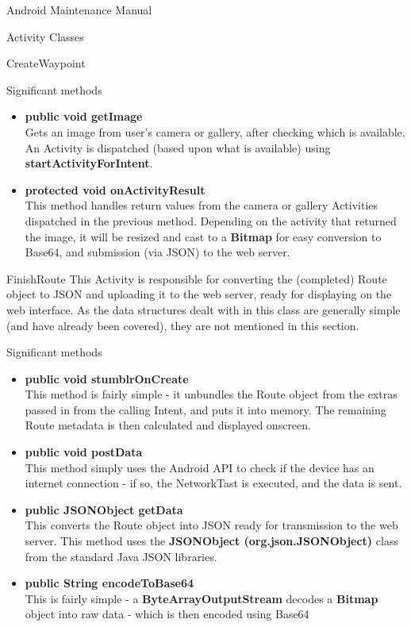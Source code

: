 \documentclass{article}
\begin{document}
\begin{section}{Android Maintenance Manual}
\begin{subsection}{Activity Classes}
\begin{subsubsection}{CreateWaypoint}
\begin{paragraph}{Significant methods}
\begin{itemize}
					\item{{\bf public void getImage} \\
					Gets an image from user's camera or gallery, after checking which is available. An Activity is dispatched (based upon what is available) using {\bf startActivityForIntent}.}
					
					\item{{\bf protected void onActivityResult} \\
					This method handles return values from the camera or gallery Activities dispatched in the previous method. Depending on the activity that returned the image, it will be resized and cast to a {\bf Bitmap} for easy conversion to Base64, and submission (via JSON) to the web server.}
				\end{itemize}
			\end{paragraph}
		\end{subsubsection}
		
		\newpage
		\begin{subsubsection}{FinishRoute}
		This Activity is responsible for converting the (completed) Route object to JSON and uploading it to the web server, ready for displaying on the web interface. As the data structures dealt with in this class are generally simple (and have already been covered), they are not mentioned in this section.
			\begin{paragraph}{Significant methods}
				\begin{itemize}
					\item{{\bf public void stumblrOnCreate} \\
					This method is fairly simple - it unbundles the Route object from the extras passed in from the calling Intent, and puts it into memory. The remaining Route metadata is then calculated and displayed onscreen.}
					\item{{\bf public void postData} \\
					This method simply uses the Android API to check if the device has an internet connection - if so, the NetworkTast is executed, and the data is sent.}
					
					\item{{\bf public JSONObject getData} \\
					This converts the Route object into JSON ready for transmission to the web server. This method uses the {\bf JSONObject (org.json.JSONObject)} class from the standard Java JSON libraries.}
					
					\item{{\bf public String encodeToBase64} \\
					This is fairly simple - a {\bf ByteArrayOutputStream} decodes a {\bf Bitmap} object into raw data - which is then encoded using Base64}
				\end{itemize}
			\end{paragraph}
		\end{subsubsection}
		

\end{subsection}
\end{section}
\end{document}
